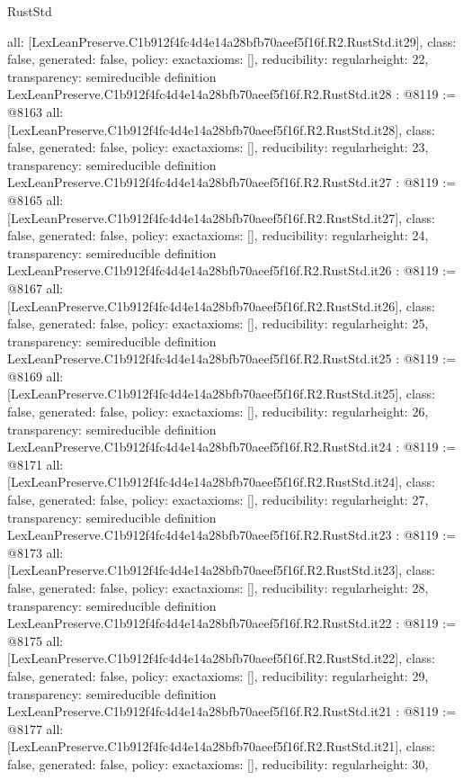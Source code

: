 \begin{lexlean}{RustStd}
\begin{coremodule}
{  all: [LexLeanPreserve.C1b912f4fc4d4e14a28bfb70aeef5f16f.R2.RustStd.it29],
  class: false,
  generated: false,
  policy: exact{axioms: []},
  reducibility: regular{height: 22},
  transparency: semireducible
}
definition LexLeanPreserve.C1b912f4fc4d4e14a28bfb70aeef5f16f.R2.RustStd.it28 : @8119 := @8163 {
  all: [LexLeanPreserve.C1b912f4fc4d4e14a28bfb70aeef5f16f.R2.RustStd.it28],
  class: false,
  generated: false,
  policy: exact{axioms: []},
  reducibility: regular{height: 23},
  transparency: semireducible
}
definition LexLeanPreserve.C1b912f4fc4d4e14a28bfb70aeef5f16f.R2.RustStd.it27 : @8119 := @8165 {
  all: [LexLeanPreserve.C1b912f4fc4d4e14a28bfb70aeef5f16f.R2.RustStd.it27],
  class: false,
  generated: false,
  policy: exact{axioms: []},
  reducibility: regular{height: 24},
  transparency: semireducible
}
definition LexLeanPreserve.C1b912f4fc4d4e14a28bfb70aeef5f16f.R2.RustStd.it26 : @8119 := @8167 {
  all: [LexLeanPreserve.C1b912f4fc4d4e14a28bfb70aeef5f16f.R2.RustStd.it26],
  class: false,
  generated: false,
  policy: exact{axioms: []},
  reducibility: regular{height: 25},
  transparency: semireducible
}
definition LexLeanPreserve.C1b912f4fc4d4e14a28bfb70aeef5f16f.R2.RustStd.it25 : @8119 := @8169 {
  all: [LexLeanPreserve.C1b912f4fc4d4e14a28bfb70aeef5f16f.R2.RustStd.it25],
  class: false,
  generated: false,
  policy: exact{axioms: []},
  reducibility: regular{height: 26},
  transparency: semireducible
}
definition LexLeanPreserve.C1b912f4fc4d4e14a28bfb70aeef5f16f.R2.RustStd.it24 : @8119 := @8171 {
  all: [LexLeanPreserve.C1b912f4fc4d4e14a28bfb70aeef5f16f.R2.RustStd.it24],
  class: false,
  generated: false,
  policy: exact{axioms: []},
  reducibility: regular{height: 27},
  transparency: semireducible
}
definition LexLeanPreserve.C1b912f4fc4d4e14a28bfb70aeef5f16f.R2.RustStd.it23 : @8119 := @8173 {
  all: [LexLeanPreserve.C1b912f4fc4d4e14a28bfb70aeef5f16f.R2.RustStd.it23],
  class: false,
  generated: false,
  policy: exact{axioms: []},
  reducibility: regular{height: 28},
  transparency: semireducible
}
definition LexLeanPreserve.C1b912f4fc4d4e14a28bfb70aeef5f16f.R2.RustStd.it22 : @8119 := @8175 {
  all: [LexLeanPreserve.C1b912f4fc4d4e14a28bfb70aeef5f16f.R2.RustStd.it22],
  class: false,
  generated: false,
  policy: exact{axioms: []},
  reducibility: regular{height: 29},
  transparency: semireducible
}
definition LexLeanPreserve.C1b912f4fc4d4e14a28bfb70aeef5f16f.R2.RustStd.it21 : @8119 := @8177 {
  all: [LexLeanPreserve.C1b912f4fc4d4e14a28bfb70aeef5f16f.R2.RustStd.it21],
  class: false,
  generated: false,
  policy: exact{axioms: []},
  reducibility: regular{height: 30},
}
\end{coremodule}
\end{lexlean}
